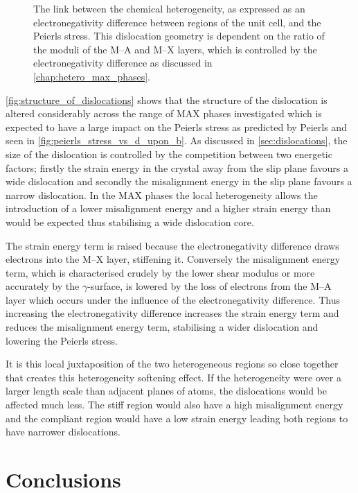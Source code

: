 \begin{figure}
\caption[The link between the structure of dislocations and local heterogeneity.]{The link between the chemical heterogeneity, as expressed as an electronegativity difference between regions of the unit cell, and the Peierls stress. This dislocation geometry is dependent on the ratio of the moduli of the M--A and M--X layers, which is controlled by the electronegativity difference as discussed in \autoref{chap:hetero_max_phases}. \label{fig:structure_of_dislocations}}
\end{figure}


\autoref{fig:structure_of_dislocations} shows that the structure of the dislocation is altered considerably across the range of MAX phases investigated which is expected to have a large impact on the Peierls stress as predicted by Peierls and seen in \autoref{fig:peierls_stress_vs_d_upon_b}. As discussed in \autoref{sec:dislocations}, the size of the dislocation is controlled by the competition between two energetic factors; firstly the strain energy in the crystal away from the slip plane favours a wide dislocation and secondly the misalignment energy in the slip plane favours a narrow dislocation. In the MAX phases the local heterogeneity allows the introduction of a lower misalignment energy and a higher strain energy than would be expected thus stabilising a wide dislocation core.

The strain energy term is raised because the electronegativity difference draws electrons into the M--X layer, stiffening it. Conversely the misalignment energy term, which is characterised crudely by the lower shear modulus or more accurately by the $\gamma$-surface, is lowered by the loss of electrons from the M--A layer which occurs under the influence of the electronegativity difference. Thus increasing the electronegativity difference increases the strain energy term and reduces the misalignment energy term, stabilising a wider dislocation and lowering the Peierls stress.

It is this local juxtaposition of the two heterogeneous regions so close together that creates this heterogeneity softening effect. If the heterogeneity were over a larger length scale than adjacent planes of atoms, the dislocations would be affected much less. The stiff region would also have a high misalignment energy and the compliant region would have a low strain energy leading both regions to have narrower dislocations.





\section{Conclusions}

